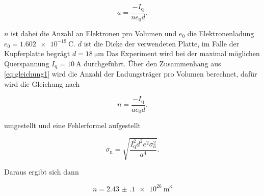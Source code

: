 \begin{equation}
    a = \frac{-I_\text{q}}{n e_0 d}.
    \label{eq:gleichung1}
\end{equation}

$n$ ist dabei die Anzahl an Elektronen pro Volumen und $e_0$ die Elektronenladung $e_0 = \SI{1.602e-19}{\coulomb}$. $d$ ist die Dicke der verwendeten Platte, im Falle der Kupferplatte begrägt $d = \SI{18}{\micro\meter}$
Das Experiment wird bei der maximal möglichen Querspannung $I_\text{q} = \SI{10}{\ampere}$ durchgeführt.
Über den Zusammenhang aus \autoref{eq:gleichung1} wird die Anzahl der Ladungsträger pro Volumen berechnet, dafür wird die Gleichung nach 

\begin{equation}
    n = \frac{-I_\text{q}}{a e_0 d}.
    \label{eq:gleichung2}
\end{equation}

umgestellt und eine Fehlerformel aufgestellt

\begin{equation}
    \sigma _\text{n} = \sqrt{\frac {I_\text{q}^{2} d^{2} e^{2} \sigma_{a}^{2} }{a^{4}}}.
    \label{eq:gleichung3}
\end{equation}

Daraus ergibt sich dann

\begin{equation}
    n = \SI{2.43(10)e26}{\cubic\meter}
    \label{eq:gleichung4}
\end{equation}